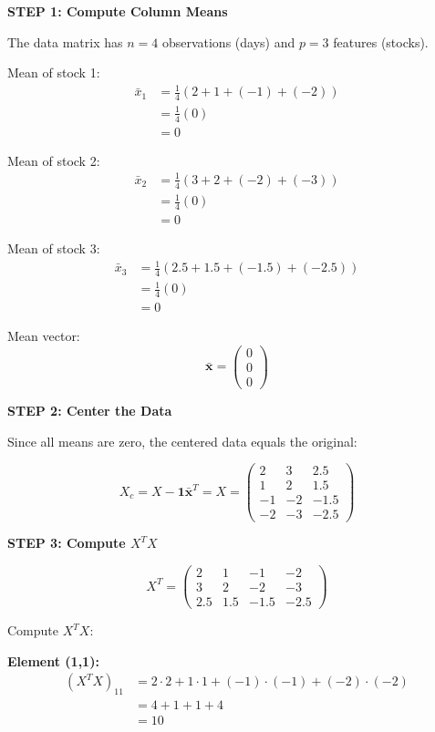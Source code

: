 \documentclass[12pt]{article}
\begin{document}
\begin{solution}

\textbf{STEP 1: Compute Column Means}

The data matrix has $n = 4$ observations (days) and $p = 3$ features (stocks).

Mean of stock 1:
\begin{align*}
\bar{x}_1 &= \frac{1}{4}(2 + 1 + (-1) + (-2)) \\
&= \frac{1}{4}(0) \\
&= 0
\end{align*}

Mean of stock 2:
\begin{align*}
\bar{x}_2 &= \frac{1}{4}(3 + 2 + (-2) + (-3)) \\
&= \frac{1}{4}(0) \\
&= 0
\end{align*}

Mean of stock 3:
\begin{align*}
\bar{x}_3 &= \frac{1}{4}(2.5 + 1.5 + (-1.5) + (-2.5)) \\
&= \frac{1}{4}(0) \\
&= 0
\end{align*}

Mean vector:
\[
\bar{\mathbf{x}} = \begin{pmatrix} 0 \\ 0 \\ 0 \end{pmatrix}
\]

\textbf{STEP 2: Center the Data}

Since all means are zero, the centered data equals the original:

\[
X_c = X - \mathbf{1}\bar{\mathbf{x}}^T = X = \begin{pmatrix}
2 & 3 & 2.5 \\
1 & 2 & 1.5 \\
-1 & -2 & -1.5 \\
-2 & -3 & -2.5
\end{pmatrix}
\]

\textbf{STEP 3: Compute $X^T X$}

\[
X^T = \begin{pmatrix}
2 & 1 & -1 & -2 \\
3 & 2 & -2 & -3 \\
2.5 & 1.5 & -1.5 & -2.5
\end{pmatrix}
\]

Compute $X^T X$:

\textbf{Element (1,1):}
\begin{align*}
(X^T X)_{11} &= 2 \cdot 2 + 1 \cdot 1 + (-1) \cdot (-1) + (-2) \cdot (-2) \\
&= 4 + 1 + 1 + 4 \\
&= 10
\end{align*}


\end{solution}
\end{document}
